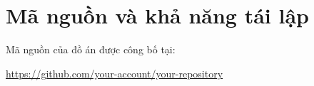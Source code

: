 \chapter{Mã nguồn và khả năng tái lập}
\label{app:source-code}

\noindent
Mã nguồn của đồ án được công bố tại:
\begin{center}
  \url{https://github.com/your-account/your-repository}
\end{center}
